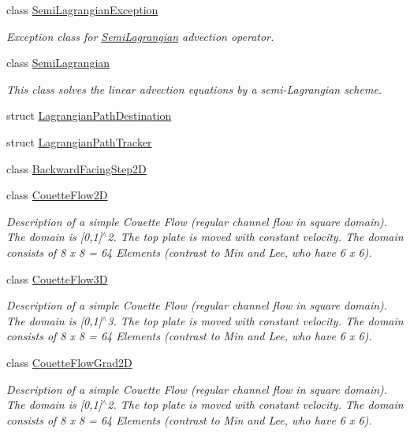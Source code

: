 \begin{DoxyCompactItemize}
class \hyperlink{classnatrium_1_1SemiLagrangianException}{SemiLagrangianException}
\begin{DoxyCompactList}\small\item\em Exception class for \hyperlink{classnatrium_1_1SemiLagrangian}{SemiLagrangian} advection operator. \item\end{DoxyCompactList}\item 
class \hyperlink{classnatrium_1_1SemiLagrangian}{SemiLagrangian}
\begin{DoxyCompactList}\small\item\em This class solves the linear advection equations by a semi-\/Lagrangian scheme. \item\end{DoxyCompactList}\item 
struct \hyperlink{structnatrium_1_1LagrangianPathDestination}{LagrangianPathDestination}
\item 
struct \hyperlink{structnatrium_1_1LagrangianPathTracker}{LagrangianPathTracker}
\item 
class \hyperlink{classnatrium_1_1BackwardFacingStep2D}{BackwardFacingStep2D}
\item 
class \hyperlink{classnatrium_1_1CouetteFlow2D}{CouetteFlow2D}
\begin{DoxyCompactList}\small\item\em Description of a simple Couette Flow (regular channel flow in square domain). The domain is \mbox{[}0,1\mbox{]}$^\wedge$2. The top plate is moved with constant velocity. The domain consists of 8 x 8 = 64 Elements (contrast to Min and Lee, who have 6 x 6). \item\end{DoxyCompactList}\item 
class \hyperlink{classnatrium_1_1CouetteFlow3D}{CouetteFlow3D}
\begin{DoxyCompactList}\small\item\em Description of a simple Couette Flow (regular channel flow in square domain). The domain is \mbox{[}0,1\mbox{]}$^\wedge$3. The top plate is moved with constant velocity. The domain consists of 8 x 8 = 64 Elements (contrast to Min and Lee, who have 6 x 6). \item\end{DoxyCompactList}\item 
class \hyperlink{classnatrium_1_1CouetteFlowGrad2D}{CouetteFlowGrad2D}
\begin{DoxyCompactList}\small\item\em Description of a simple Couette Flow (regular channel flow in square domain). The domain is \mbox{[}0,1\mbox{]}$^\wedge$2. The top plate is moved with constant velocity. The domain consists of 8 x 8 = 64 Elements (contrast to Min and Lee, who have 6 x 6). \item\end{DoxyCompactList}\item 

\end{DoxyCompactItemize}
